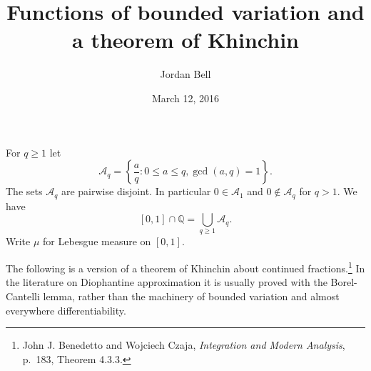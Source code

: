 \documentclass{article}
\theoremstyle{definition}
\begin{document}
\title{Functions of bounded variation and a theorem of Khinchin}
\author{Jordan Bell}
\date{March 12, 2016}

\maketitle

For $q \geq 1$ let
\[
\mathscr{A}_q = \left\{\frac{a}{q}: 0 \leq a \leq q, \gcd(a,q)=1\right\}.
\]
The sets $\mathscr{A}_q$ are pairwise disjoint. In particular $0 \in \mathscr{A}_1$ and $0 \not \in \mathscr{A}_q$ for $q>1$.
We have
\[
[0,1] \cap \mathbb{Q} = \bigcup_{q \geq 1} \mathscr{A}_q.
\]
Write $\mu$ for Lebesgue measure on $[0,1]$. 


The following is a version of a theorem of Khinchin about continued fractions.\footnote{John J. Benedetto and Wojciech Czaja, {\em Integration and Modern Analysis}, p.~183, Theorem 4.3.3.} In the literature on Diophantine approximation it is usually proved with the Borel-Cantelli lemma, rather than the machinery of bounded variation and 
almost everywhere differentiability.
\end{document}
